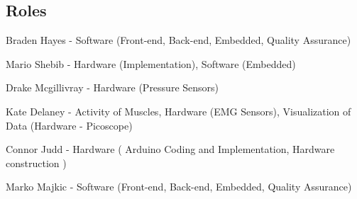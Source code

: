 \subsection{Roles}
\noindent Braden Hayes - Software (Front-end, Back-end, Embedded, Quality Assurance)

\noindent Mario Shebib - Hardware (Implementation), Software (Embedded)

\noindent Drake Mcgillivray - Hardware (Pressure Sensors)

\noindent Kate Delaney - Activity of Muscles, Hardware (EMG Sensors), Visualization of Data (Hardware - Picoscope)

\noindent Connor Judd - Hardware ( Arduino Coding and Implementation, Hardware construction )

\noindent Marko Majkic - Software (Front-end, Back-end, Embedded, Quality Assurance)
